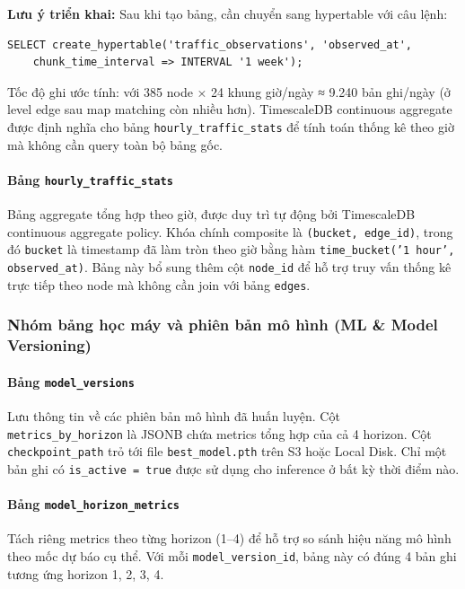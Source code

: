 \textbf{Lưu ý triển khai:} Sau khi tạo bảng, cần chuyển sang hypertable với câu lệnh:
\begin{verbatim}
SELECT create_hypertable('traffic_observations', 'observed_at',
    chunk_time_interval => INTERVAL '1 week');
\end{verbatim}

Tốc độ ghi ước tính: với 385 node × 24 khung giờ/ngày ≈ 9.240 bản ghi/ngày (ở level edge sau map matching còn nhiều hơn). TimescaleDB continuous aggregate được định nghĩa cho bảng \texttt{hourly\_traffic\_stats} để tính toán thống kê theo giờ mà không cần query toàn bộ bảng gốc.

\paragraph{Bảng \texttt{hourly\_traffic\_stats}}
Bảng aggregate tổng hợp theo giờ, được duy trì tự động bởi TimescaleDB continuous aggregate policy. Khóa chính composite là \texttt{(bucket, edge\_id)}, trong đó \texttt{bucket} là timestamp đã làm tròn theo giờ bằng hàm \texttt{time\_bucket('1 hour', observed\_at)}. Bảng này bổ sung thêm cột \texttt{node\_id} để hỗ trợ truy vấn thống kê trực tiếp theo node mà không cần join với bảng \texttt{edges}.

\subsubsection{Nhóm bảng học máy và phiên bản mô hình (ML \& Model Versioning)}

\paragraph{Bảng \texttt{model\_versions}}
Lưu thông tin về các phiên bản mô hình đã huấn luyện. Cột \texttt{metrics\_by\_horizon} là JSONB chứa metrics tổng hợp của cả 4 horizon. Cột \texttt{checkpoint\_path} trỏ tới file \texttt{best\_model.pth} trên S3 hoặc Local Disk. Chỉ một bản ghi có \texttt{is\_active = true} được sử dụng cho inference ở bất kỳ thời điểm nào.

\paragraph{Bảng \texttt{model\_horizon\_metrics}}
Tách riêng metrics theo từng horizon (1--4) để hỗ trợ so sánh hiệu năng mô hình theo mốc dự báo cụ thể. Với mỗi \texttt{model\_version\_id}, bảng này có đúng 4 bản ghi tương ứng horizon 1, 2, 3, 4.

